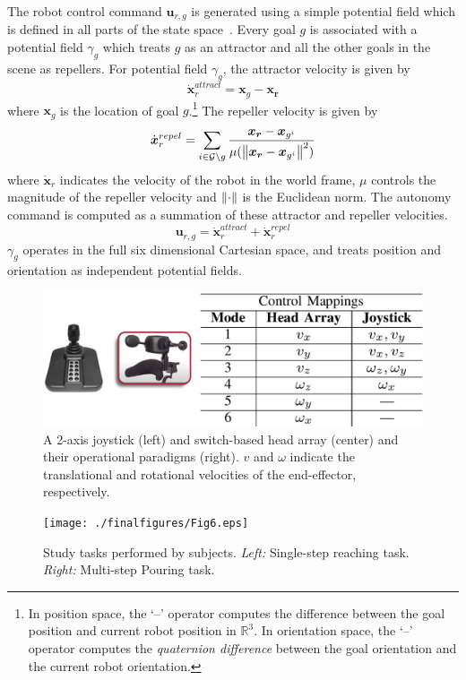 The robot control command $\boldsymbol{u}_{r,g}$ is generated using a simple potential field which is defined in all parts of the state space~\cite{khatib1986real}. Every goal $g$ is associated with a potential field $\gamma_g$ which treats $g$ as an attractor and all the other goals in the scene as repellers. For potential field $\gamma_g$, the attractor velocity is given by
\begin{equation*}
\dot{\boldsymbol{x}}_r^{attract} = \boldsymbol{x}_{g} - \boldsymbol{x_r}
\end{equation*}
where $\boldsymbol{x}_{g}$ is the location of goal $g$.\footnote{In position space, the `--' operator computes the difference between the goal position and current robot position in $\mathbb{R}^3$. In orientation space, the `--' operator computes the \textit{quaternion difference} between the goal orientation and the current robot orientation.} The repeller velocity is given by
\begin{equation*}
\dot{\boldsymbol{x}}_r^{repel} = \sum_{i \in \mathcal{G} \setminus g} \frac{\boldsymbol{x_r} - \boldsymbol{x}_{g^i}}{\mu(\left\lVert\boldsymbol{x_r} - \boldsymbol{x}_{g^i}\right\rVert^2)}
\end{equation*}
where $\dot{\boldsymbol{x}}_r$ indicates the velocity of the robot in the world frame, $\mu$ controls the magnitude of the repeller velocity and $\left\lVert\cdot\right\rVert$ is the Euclidean norm. The autonomy command is computed as a summation of these attractor and repeller velocities.
\begin{equation*}
\boldsymbol{u}_{r,g} = \dot{\boldsymbol{x}}_r^{attract} + \dot{\boldsymbol{x}}_r^{repel} 
\end{equation*}
$\gamma_g$ operates in the full six dimensional Cartesian space, and treats position and orientation as independent potential fields. 
\begin{figure}[b]
	\centering
	\includegraphics[width = 1\hsize, height = 0.14\vsize]{./finalfigures/Fig5.eps}
	\caption{A 2-axis joystick (left) and switch-based head array (center) and their operational paradigms (right). $v$ and $\omega$ indicate the translational and rotational velocities of the end-effector, respectively.}
	\label{fig:interfaces}
\end{figure}
\begin{figure}[ht!]
	\texttt{[image: ./finalfigures/Fig6.eps]}
	\caption{Study tasks performed by subjects. \textit{Left:} Single-step reaching task. \textit{Right:} Multi-step Pouring task. }
	\label{fig:tasks}
\end{figure}

